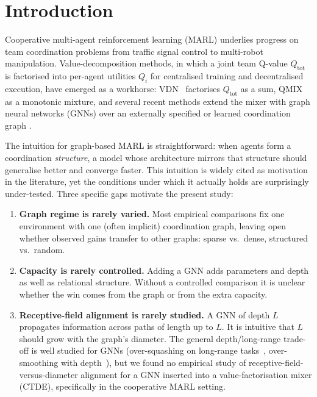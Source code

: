 \documentclass[manuscript, screen, review]{jair}
\providecommand{\citep}{\parencite}
\newcommand{\algoname}[1]{\textsc{#1}}
\newcommand{\vdn}{\algoname{VDN}}
\newcommand{\qmix}{\algoname{QMIX}}
\newcommand{\Qtot}{Q_{\mathrm{tot}}}
\newcommand{\Qi}{Q_i}
\begin{document}
\maketitle


\section{Introduction}
\label{sec:intro}

Cooperative multi-agent reinforcement learning (MARL) underlies progress on
team coordination problems from traffic signal control to multi-robot
manipulation. Value-decomposition methods, in which a joint team Q-value
$\Qtot$ is factorised into per-agent utilities $\Qi$ for centralised
training and decentralised execution, have emerged as a workhorse:
\vdn~\citep{sunehag_2018_vdn} factorises $\Qtot$ as a sum, \qmix
\citep{rashid_2018_qmix,rashid_2020_qmix_jmlr} as a monotonic mixture, and
several recent methods extend the mixer with graph neural networks (GNNs)
over an externally specified or learned coordination graph
\citep{jiang_2020_dgn,liu_2020_g2anet,boehmer_2020_dcg,
       naderializadeh_2020_graphmix}.

The intuition for graph-based MARL is straightforward: when agents form
a coordination \emph{structure}, a model whose architecture mirrors that
structure should generalise better and converge faster. This intuition
is widely cited as motivation in the literature, yet the conditions
under which it actually holds are surprisingly under-tested. Three
specific gaps motivate the present study:

\begin{enumerate}[leftmargin=*,itemsep=0pt,topsep=2pt]
  \item \textbf{Graph regime is rarely varied.} Most empirical comparisons
        fix one environment with one (often implicit) coordination graph,
        leaving open whether observed gains transfer to other graphs:
        sparse vs.\ dense, structured vs.\ random.
  \item \textbf{Capacity is rarely controlled.} Adding a GNN adds
        parameters and depth as well as relational structure. Without a
        controlled comparison it is unclear whether the win comes from the
        graph or from the extra capacity.
  \item \textbf{Receptive-field alignment is rarely studied.} A GNN of
        depth $L$ propagates information across paths of length up to $L$.
        It is intuitive that $L$ should grow with the graph's diameter. The
        general depth/long-range trade-off is well studied for GNNs
        (over-squashing on long-range tasks~\citep{alon_2021_oversquashing},
        over-smoothing with depth~\citep{li_2018_oversmoothing}), but we
        found no empirical study of receptive-field-versus-diameter alignment
        for a GNN inserted into a value-factorisation mixer (CTDE),
        specifically in the cooperative MARL setting.
\end{enumerate}
\end{document}
